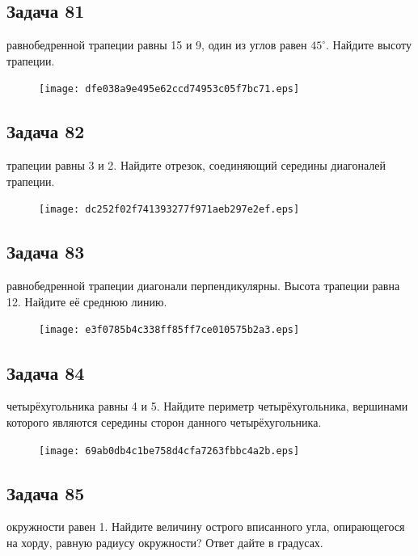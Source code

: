 \documentclass[a4paper,10pt]{article} %
\begin{document}
\begin{spacing}{1.0}
{\subsection*{Задача 81}
 равнобедренной трапеции равны 15 и 9, один из углов равен $45^\circ$. Найдите высоту трапеции.

\vspace{1.5cm}

\begin{figure}{\texttt{[image: dfe038a9e495e62ccd74953c05f7bc71.eps]}}\end{figure}
\subsection*{Задача 82}
 трапеции равны 3 и 2. Найдите отрезок, соединяющий середины диагоналей трапеции.

\vspace{1.5cm}

\begin{figure}{\texttt{[image: dc252f02f741393277f971aeb297e2ef.eps]}}\end{figure}
\subsection*{Задача 83}
 равнобедренной трапеции диагонали перпендикулярны. Высота трапеции равна 12. Найдите её среднюю линию.

\vspace{1.5cm}

\begin{figure}{\texttt{[image: e3f0785b4c338ff85ff7ce010575b2a3.eps]}}\end{figure}
\subsection*{Задача 84}
 четырёхугольника равны 4 и 5. Найдите периметр четырёхугольника, вершинами которого являются середины сторон данного четырёхугольника.

\vspace{1.5cm}

\begin{figure}{\texttt{[image: 69ab0db4c1be758d4cfa7263fbbc4a2b.eps]}}\end{figure}
\subsection*{Задача 85}
 окружности равен 1. Найдите величину острого вписанного угла, опирающегося на хорду, равную радиусу окружности? Ответ дайте в градусах.

}
\end{spacing}
\end{document}
